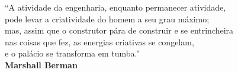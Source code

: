 
\pretextualchapter{}
\vspace{8cm}
\begin{flushright}
\textnormal{``A atividade da engenharia, enquanto permanecer atividade, \\
	 pode levar a criatividade do homem a seu grau máximo; \\
	 mas, assim que o construtor pára de construir e se entrincheira \\
	 nas coisas que fez, as energias criativas se congelam, \\
	 e o palácio se transforma em tumba.'' \\
	\bfseries Marshall Berman}
\end{flushright}

